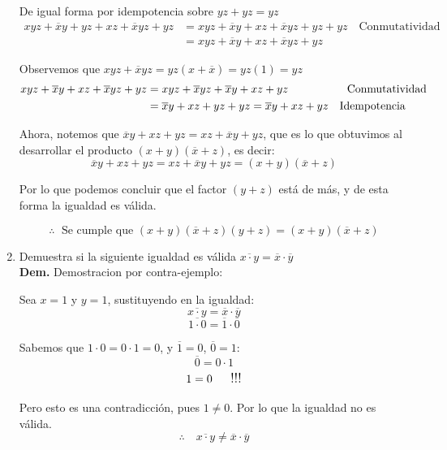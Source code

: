 \documentclass[12pt,letterpaper]{article}
\begin{document}
\begin{enumerate}[label=\arabic*.]
  De igual forma por idempotencia sobre $yz + yz = yz$
  \begin{align*}
    xyz + \overline{x}y + yz + xz + \overline{x}yz + yz &= xyz + \overline{x}y + xz + \overline{x}yz + yz + yz \quad \text{Conmutatividad}  \\
    &= xyz + \overline{x}y + xz + \overline{x}yz + yz
  \end{align*}
  
  Observemos que $xyz + \overline{x}yz = yz(x + \overline{x}) = yz(1) = yz$
  \begin{align*}
    xyz + \overline{x}y + xz + \overline{x}yz + yz &= xyz + \overline{x}yz + \overline{x}y + xz + yz \hspace{1.85cm} \text{Conmutatividad} \\
    &= \overline{x}y + xz + yz + yz = \overline{x}y + xz + yz \quad \text{Idempotencia}
  \end{align*}

  Ahora, notemos que $\overline{x}y + xz + yz = xz + \overline{x}y + yz$, que es lo que obtuvimos al desarrollar el producto $(x + y)(\overline{x} + z)$, es decir:
  \[
  \overline{x}y + xz + yz = xz + \overline{x}y + yz = (x + y)(\overline{x} + z)
  \]

  Por lo que podemos concluir que el factor $(y + z)$ est\'{a} de m\'{a}s, y de esta forma la igualdad es v\'{a}lida.

  \[
  \therefore \; \text{ Se cumple que } (x + y)(\overline{x} + z)(y + z) = (x + y)(\overline{x} + z)
  \]
  \bigskip
  
\item Demuestra si la siguiente igualdad es válida $\overline{x \cdot y} = \overline{x} \cdot \overline{y}$\\
  \textbf{Dem.} Demostracion por contra-ejemplo:
  
  Sea $x = 1$ y $y = 1$, sustituyendo en la igualdad:
  \[
  \overline{x \cdot y} = \overline{x} \cdot \overline{y}
  \]
  \[
  \overline{1 \cdot 0} = \overline{1} \cdot \overline{0}
  \]

  Sabemos que $1 \cdot 0 = 0 \cdot 1 = 0$, y $\overline{1} = 0$, $\overline{0} = 1$:
  \[
  \overline{0} = 0 \cdot 1
  \]
  \[
  1 = 0 \text{\quad \; \large{!!!}}
  \]

  Pero esto es una contradicci\'{o}n, pues $1 \neq 0$. Por lo que la igualdad no es válida.
  \[
  \therefore \quad \overline{x \cdot y} \neq \overline{x} \cdot \overline{y}
  \]
  
  \bigskip
  

\end{enumerate}
\end{document}
